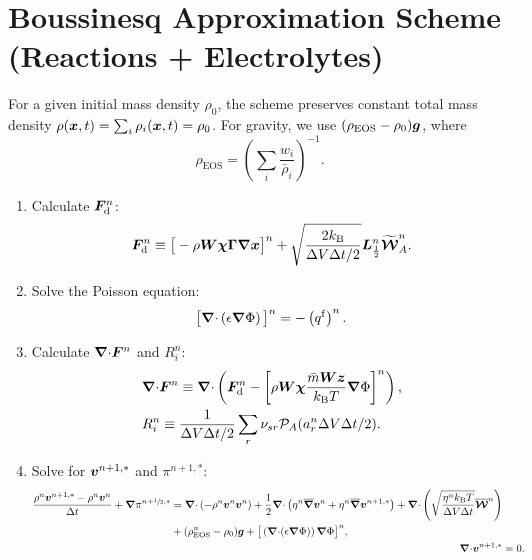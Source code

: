 \documentclass[
10pt
showpacs, showkeys,
amsmath,amssymb,
aps,
pre,
floatfix,
]{revtex4-1}
\newcommand{\divg}{{\V\nabla\cdot}}                       %
\begin{document}
\section*{Boussinesq Approximation Scheme (Reactions + Electrolytes)}

\noindent For a given initial mass density $\rho_0$, the scheme preserves constant total mass density $\rho(\boldsymbol{x},t)=\sum_i \rho_i(\boldsymbol{x},t)=\rho_0$.
For gravity, we use $(\rho_\mathrm{EOS} - \rho_0)\boldsymbol{g}$, where
\begin{equation}
\rho_\mathrm{EOS} = \left(\sum_i \frac{w_i}{\bar{\rho}_i}\right)^{-1}.
\end{equation}

\begin{enumerate}

\item Calculate $\boldsymbol{F}_\mathrm{d}^n$:
\begin{equation}
\boldsymbol{F}_\mathrm{d}^n \equiv \big[-\rho\boldsymbol{W}\boldsymbol{\chi}\boldsymbol{\Gamma}\boldsymbol{\nabla}\boldsymbol{x}\big]^n + \sqrt{ \frac{2k_\mathrm{B}}{\Delta V\Delta t/2} } \boldsymbol{L}^n_{\frac12} \widetilde{\boldsymbol{\mathcal{W}}}^n_A.
\end{equation}

\item Solve the Poisson equation:
\begin{equation}
\big[\divg\left(\epsilon\grad\Phi\right)\big]^n = - \left(q^\mathrm{f}\right)^n.
\end{equation}

\item Calculate $\divg\V{F}^n$ and $R^n_i$:
\begin{align}
& \divg\V{F}^n \equiv \divg \left( \V{F}_\mathrm{d}^n - \left[\rho\M{W}\V{\chi}\frac{\bar{m}\M{W}\V{z}}{k_\mathrm{B}T}\grad\Phi\right]^n \right), \\
& R^n_i \equiv \frac{1}{\D{V}\D{t}/2}\sum_r \nu_{sr}\mathcal{P}_A(a^n_r\D{V}\D{t}/2).
\end{align}

\item Solve for $\boldsymbol{v}^{n+1,*}$ and $\pi^{n+1,*}$:
\begin{align}
\label{boussinesq_stokes_v_1st}
\begin{split}
\frac{\rho^n\V{v}^{n+1,*}-\rho^n\V{v}^n}{\D{t}} + \grad\pi^{n+\myhalf,*}
& = \divg\left(-\rho^n\V{v}^n\V{v}^n\right) + 
\frac{1}{2}\divg\left( \eta^n \overline{\grad}\V{v}^n + \eta^n \overline{\grad}\V{v}^{n+1,*} \right)
+ \divg\left( \sqrt{\frac{\eta^n k_\mathrm{B}T}{\D{V}\D{t}} } \overline{\V{\mathcal{W}}}^n \right)
\\
& + (\rho^n_\mathrm{EOS}-\rho_0)\V{g} +\big[\left(\divg(\epsilon\grad\Phi)\right)\grad\Phi\big]^n,
\end{split}
\\
\label{boussinesq_stokes_p_1st}
\divg\V{v}^{n+1,*} & = 0.
\end{align}


\end{enumerate}
\end{document}
